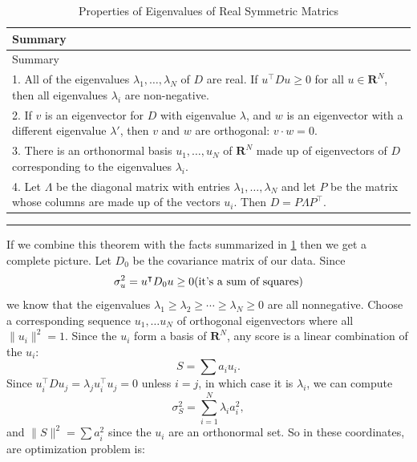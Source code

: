 \documentclass[]{article}
\begin{document}
\begin{longtable}[]{@{}l@{}}
\caption{Properties of Eigenvalues of Real Symmetric Matrics
\label{tbl:symmmat}}\tabularnewline
\toprule
\begin{minipage}[b]{0.97\columnwidth}\raggedright
Summary\strut
\end{minipage}\tabularnewline
\midrule
\endfirsthead
\toprule
\begin{minipage}[b]{0.97\columnwidth}\raggedright
Summary\strut
\end{minipage}\tabularnewline
\midrule
\endhead
\begin{minipage}[t]{0.97\columnwidth}\raggedright
1. All of the eigenvalues \(\lambda_{1},\ldots, \lambda_{N}\) of \(D\)
are real. If \(u^{\intercal}Du\ge 0\) for all \(u\in\mathbf{R}^{N}\),
then all eigenvalues \(\lambda_{i}\) are non-negative.\strut
\end{minipage}\tabularnewline
\begin{minipage}[t]{0.97\columnwidth}\raggedright
2. If \(v\) is an eigenvector for \(D\) with eigenvalue \(\lambda\), and
\(w\) is an eigenvector with a different eigenvalue \(\lambda'\), then
\(v\) and \(w\) are orthogonal: \(v\cdot w = 0\).\strut
\end{minipage}\tabularnewline
\begin{minipage}[t]{0.97\columnwidth}\raggedright
3. There is an orthonormal basis \(u_{1},\ldots, u_{N}\) of
\(\mathbf{R}^{N}\) made up of eigenvectors of \(D\) corresponding to the
eigenvalues \(\lambda_{i}\).\strut
\end{minipage}\tabularnewline
\begin{minipage}[t]{0.97\columnwidth}\raggedright
4. Let \(\Lambda\) be the diagonal matrix with entries
\(\lambda_{1},\ldots, \lambda_{N}\) and let \(P\) be the matrix whose
columns are made up of the vectors \(u_{i}\). Then
\(D = P\Lambda P^{\intercal}.\)\strut
\end{minipage}\tabularnewline
\bottomrule
\end{longtable}

\begin{center}\rule{0.5\linewidth}{\linethickness}\end{center}

If we combine this theorem with the facts summarized in
\cref{tbl:symmmat} then we get a complete picture. Let \(D_{0}\) be the
covariance matrix of our data. Since \[
\sigma_{u}^2 = u^{\intercal}D_{0}u\ge 0 \hbox{(it's a sum of squares)}
\] we know that the eigenvalues
\(\lambda_{1}\ge\lambda_{2}\ge \cdots \ge \lambda_{N}\ge 0\) are all
nonnegative. Choose a corresponding sequence \(u_{1},\ldots u_{N}\) of
orthogonal eigenvectors where all \(\|u_{i}\|^2=1\). Since the \(u_{i}\)
form a basis of \(\mathbf{R}^{N}\), any score is a linear combination of
the \(u_{i}\): \[
S = \sum a_{i}u_{i}.
\] Since
\(u_{i}^{\intercal}Du_{j} = \lambda_{j}u_{i}^{\intercal}u_{j} = 0\)
unless \(i=j\), in which case it is \(\lambda_{i}\), we can compute \[
\sigma_{S}^2 = \sum_{i=1}^{N} \lambda_{i}a_{i}^2,
\] and \(\|S\|^2=\sum a_{i}^2\) since the \(u_{i}\) are an orthonormal
set. So in these coordinates, are optimization problem is:
\end{document}
